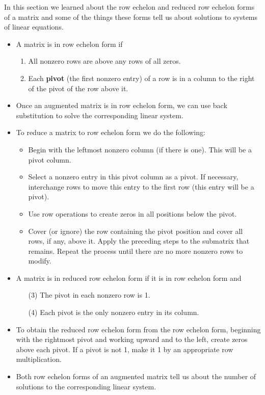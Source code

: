 In this section we learned about the row echelon and reduced row echelon forms of a matrix and some of the things these forms tell us about solutions to systems of linear equations. 
\begin{itemize}
\item A matrix is in row echelon form if 
	\begin{enumerate}
    \item All nonzero rows are above any rows of all zeros.
    \item Each \textbf{pivot} (the first nonzero entry) of a row is in a column to the right of the pivot of the row above it.
    \end{enumerate}
\item Once an augmented matrix is in row echelon form, we can use back substitution to solve the corresponding linear system. 
\item To reduce a matrix to row echelon form we do the following: 
	\begin{itemize}
	\item Begin with the leftmost nonzero column (if there is one). This will be a pivot column. 
	\item Select a nonzero entry in this pivot column as a pivot. If necessary, interchange rows to move this entry to the first row (this entry will be a pivot).
	\item Use row operations to create zeros in all positions below the pivot.
	\item Cover (or ignore) the row containing the pivot position and cover all rows, if any, above it. Apply the preceding steps to the submatrix that remains. Repeat the process until there are no more nonzero rows to modify.
	\end{itemize}
\item A matrix is in reduced row echelon form if it is in row echelon form and 
	\begin{enumerate}
    \item[(3)] The pivot in each nonzero row is 1.
    \item[(4)] Each pivot is the only nonzero entry in its column.
	\end{enumerate}
\item To obtain the reduced row echelon form from the row echelon form, beginning with the rightmost pivot and working upward and to the left, create zeros above each pivot. If a pivot is not 1, make it 1 by an appropriate row multiplication.
\item Both row echelon forms of an augmented matrix tell us about the number of solutions to the corresponding linear system.

\end{itemize}

